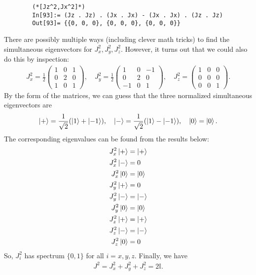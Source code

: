 \documentclass{article}
\theoremstyle{definition}
\newcommand{\f}[2]{\frac{#1}{#2}}
\begin{document}
\begin{enumerate}[label=(\alph*)]
\begin{lstlisting}
		(*[Jz^2,Jx^2]*)
		In[93]:= (Jz . Jz) . (Jx . Jx) - (Jx . Jx) . (Jz . Jz)
		Out[93]= {{0, 0, 0}, {0, 0, 0}, {0, 0, 0}}
	\end{lstlisting}
	There are possibly multiple ways (including clever math tricks) to find the simultaneous eigenvectors for $J_x^2,J_y^2,J_z^2$. However, it turns out that we could also do this by inspection:
	\begin{align*}
		J_x^2 = \f{1}{2}\begin{pmatrix}
			1 & 0 & 1 \\
			0 & 2 & 0 \\
			1 & 0 & 1
		\end{pmatrix}, \quad 
		J_y^2 = \f{1}{2}\begin{pmatrix}
			1 & 0 &- 1 \\
			0 & 2 & 0 \\
			-1 & 0 & 1
		\end{pmatrix}, \quad
		J_z^2 = \begin{pmatrix}
			1 & 0 & 0 \\
			0 & 0 & 0 \\
			0 & 0 & 1
		\end{pmatrix}.
	\end{align*}
	By the form of the matrices, we can guess that the three normalized simultaneous eigenvectors are
	\begin{align*}
		\ket{+} = \f{1}{\sqrt{2}}(\ket{1} + \ket{-1}), \quad 
		\ket{-} = \f{1}{\sqrt{2}}(\ket{1} - \ket{-1}), \quad
		\ket{0} = \ket{0}.
	\end{align*}
	The corresponding eigenvalues can be found from the results below:
	\begin{align*}
		J_x^2 \ket{+} &= \ket{+} \\
		J_x^2 \ket{-} &= 0\\
		J_x^2 \ket{0} &= \ket{0}\\
		J_y^2 \ket{+} &= 0\\
		J_y^2 \ket{-} &= \ket{-}\\
		J_y^2 \ket{0} &= \ket{0}\\
		J_z^2 \ket{+} &= \ket{+}\\
		J_z^2 \ket{-} &= \ket{-}\\
		J_z^2 \ket{0} &= 0
	\end{align*}
	So, $J_i^2$ has spectrum $\{0,1\}$ for all $i=x,y,z$. Finally, we have
	\begin{align*}
		J^2 = J_x^2 + J_y^2 + J_z^2 = 2\mathbb{I}.
	\end{align*}
	

\end{enumerate}
\end{document}
